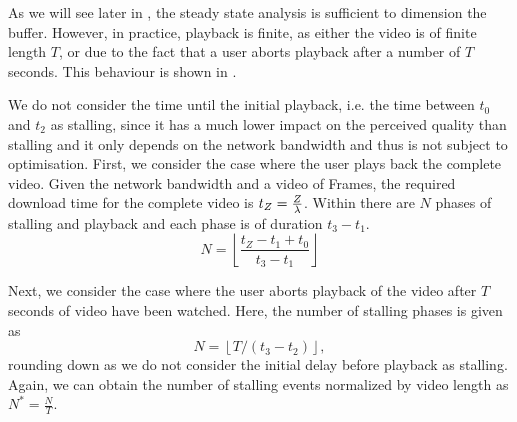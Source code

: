 As we will see later in , the steady state analysis is sufficient to dimension the buffer. 
However, in practice, playback is finite, as either the video is of finite length \(T\), or due to the fact that a user aborts playback after a number of \(T\) seconds.
This behaviour is shown in .

We do not consider the time until the initial playback, i.e. the time between \(t_0\) and \(t_2\) as stalling, since it has a much lower impact on the perceived quality than stalling \cite{Garcia2014} and it only depends on the network bandwidth \networkBandwidth and thus is not subject to optimisation.
First, we consider the case where the user plays back the complete video.
Given the network bandwidth \networkBandwidth and a video of \numberFrames Frames, the required download time for the complete video is \(t_Z = \frac{Z}{\lambda}\).
Within \videoDownloadTime there are \(N\) phases of stalling and playback and each phase is of duration \(t_3 - t_1\).
\[
N = \left\lfloor \frac{t_Z-t_1+t_0}{t_3-t_1} \right\rfloor 
\]

Next, we consider the case where the user aborts playback of the video after \(T\) seconds of video have been watched.
Here, the number of stalling phases is given as 
\[
N = \left \lfloor{T / (t_3 - t_2)}\right \rfloor,
\]
rounding down as we do not consider the initial delay before playback as stalling.
Again, we can obtain the number of stalling events normalized by video length as
\(N^*=\frac{N}{T}\).